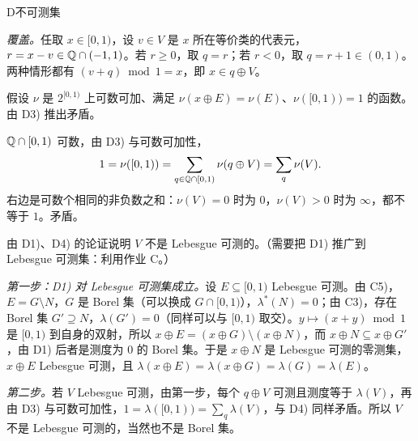 \begin{probleme}{D}{不可测集}
\begin{questions}
\begin{solution}
\emph{覆盖。}任取 $x\in[0,1)$，设 $v\in V$ 是 $x$ 所在等价类的代表元，$r=x-v\in\mathbb{Q}\cap(-1,1)$。若 $r\geqslant0$，取 $q=r$；若 $r<0$，取 $q=r+1\in(0,1)$。两种情形都有 $(v+q)\bmod1=x$，即 $x\in q\oplus V$。
\end{solution}
\item 假设 $\nu$ 是 $2^{[0,1)}$ 上可数可加、满足 $\nu(x\oplus E)=\nu(E)$、$\nu([0,1))=1$ 的函数。由 D3) 推出矛盾。
\begin{solution}
$\mathbb{Q}\cap[0,1)$ 可数，由 D3) 与可数可加性，
\[
1=\nu([0,1))=\sum_{q\in\mathbb{Q}\cap[0,1)}\nu(q\oplus V)=\sum_{q}\nu(V).
\]
右边是可数个相同的非负数之和：$\nu(V)=0$ 时为 $0$，$\nu(V)>0$ 时为 $\infty$，都不等于 $1$。矛盾。
\end{solution}
\item 由 D1)、D4) 的论证说明 $V$ 不是 Lebesgue 可测的。（需要把 D1) 推广到 Lebesgue 可测集：利用作业 C。）
\begin{solution}
\emph{第一步：D1) 对 Lebesgue 可测集成立。}设 $E\subseteq[0,1)$ Lebesgue 可测。由 C5)，$E=G\setminus N$，$G$ 是 Borel 集（可以换成 $G\cap[0,1)$），$\lambda^*(N)=0$；由 C3)，存在 Borel 集 $G'\supseteq N$，$\lambda(G')=0$（同样可以与 $[0,1)$ 取交）。$y\mapsto(x+y)\bmod1$ 是 $[0,1)$ 到自身的双射，所以 $x\oplus E=(x\oplus G)\setminus(x\oplus N)$，而 $x\oplus N\subseteq x\oplus G'$，由 D1) 后者是测度为 $0$ 的 Borel 集。于是 $x\oplus N$ 是 Lebesgue 可测的零测集，$x\oplus E$ Lebesgue 可测，且 $\lambda(x\oplus E)=\lambda(x\oplus G)=\lambda(G)=\lambda(E)$。

\emph{第二步。}若 $V$ Lebesgue 可测，由第一步，每个 $q\oplus V$ 可测且测度等于 $\lambda(V)$，再由 D3) 与可数可加性，$1=\lambda([0,1))=\sum_q\lambda(V)$，与 D4) 同样矛盾。所以 $V$ 不是 Lebesgue 可测的，当然也不是 Borel 集。
\end{solution}
\end{questions}
\end{probleme}

\thinkingpart

